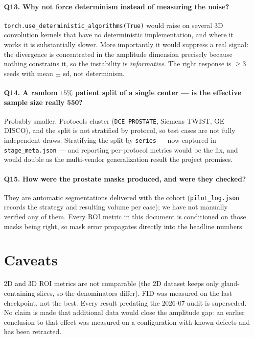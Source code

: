 \documentclass[11pt]{article}
\newcommand{\1}{\mathbb{1}}
\begin{document}
\paragraph{Q13. Why not force determinism instead of measuring the noise?}
\texttt{torch.use\_deterministic\_algorithms(True)} would raise on several 3D convolution
kernels that have no deterministic implementation, and where it works it is substantially
slower. More importantly it would suppress a real signal: the divergence is concentrated in
the amplitude dimension precisely because nothing constrains it, so the instability is
\emph{informative}. The right response is $\ge3$ seeds with mean $\pm$ sd, not determinism.

\paragraph{Q14. A random $15\%$ patient split of a single center --- is the effective sample
size really 550?}
Probably smaller. Protocols cluster (\texttt{DCE PROSTATE}, Siemens TWIST, GE DISCO), and the
split is not stratified by protocol, so test cases are not fully independent draws.
Stratifying the split by \texttt{series} --- now captured in \texttt{stage\_meta.json} --- and
reporting per-protocol metrics would be the fix, and would double as the multi-vendor
generalization result the project promises.

\paragraph{Q15. How were the prostate masks produced, and were they checked?}
They are automatic segmentations delivered with the cohort (\texttt{pilot\_log.json} records
the strategy and resulting volume per case); we have not manually verified any of them.
Every ROI metric in this document is conditioned on those masks being right, so mask error
propagates directly into the headline numbers.

\section{Caveats}

2D and 3D ROI metrics are not comparable (the 2D dataset keeps only gland-containing slices,
so the denominators differ). FID was measured on the last checkpoint, not the best.
Every result predating the 2026-07 audit is superseded. No claim is made that additional
data would close the amplitude gap: an earlier conclusion to that effect was measured on a
configuration with known defects and has been retracted.
\end{document}
